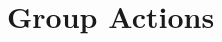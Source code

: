\documentclass[openany, amssymb, psamsfonts]{amsart}
\theoremstyle{definition}
\numberwithin{equation}{section}
\begin{document}
\section{Group Actions}
\end{document}

